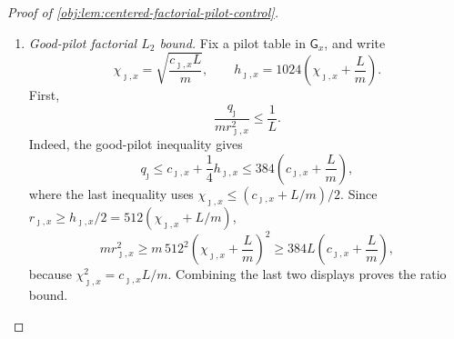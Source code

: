 \begin{proof}[Proof of \cref{obj:lem:centered-factorial-pilot-control}]
\begin{enumerate}
\item \label{item:pf-good-pilot-factorial-ltwo}\emph{Good-pilot factorial \(L_2\) bound.}
Fix a pilot table in \(\mathsf G_x\), and write
\[
\chi_{\jmath,x}=\sqrt{\frac{c_{\jmath,x}L}{m}},
\qquad
h_{\jmath,x}=1024\left(\chi_{\jmath,x}+\frac Lm\right).
\]
First,
\[
\frac{q_\jmath}{m r_{\jmath,x}^2}\le\frac1L .
\]
Indeed, the good-pilot inequality gives
\[
q_\jmath\le c_{\jmath,x}+\frac14h_{\jmath,x}
\le 384\left(c_{\jmath,x}+\frac Lm\right),
\]
where the last inequality uses
\(\chi_{\jmath,x}\le (c_{\jmath,x}+L/m)/2\).  Since
\(r_{\jmath,x}\ge h_{\jmath,x}/2=512(\chi_{\jmath,x}+L/m)\),
\[
m r_{\jmath,x}^2
\ge
m\,512^2\left(\chi_{\jmath,x}+\frac Lm\right)^2
\ge
384L\left(c_{\jmath,x}+\frac Lm\right),
\]
because \(\chi_{\jmath,x}^2=c_{\jmath,x}L/m\).  Combining the last two displays proves the ratio bound.


\end{enumerate}
\end{proof}

